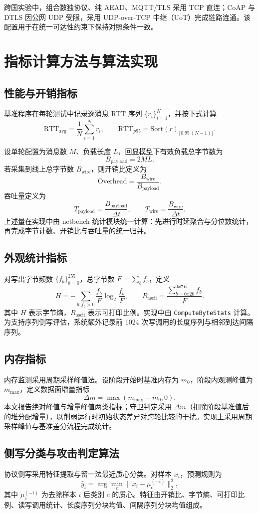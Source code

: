 跨国实验中，组合数独协议、纯 AEAD、MQTT/TLS 采用 TCP 直连；CoAP 与 DTLS 因公网 UDP 受限，采用 UDP-over-TCP 中继（UoT）完成链路连通。该配置用于在统一可达性约束下保持对照条件一致\cite{rfc8085,rfc4787,nedergaard2023coapsecure,ren2020coapcongestion}。

\section{指标计算方法与算法实现}
\subsection{性能与开销指标}
基准程序在每轮测试中记录逐消息 RTT 序列 $\{r_i\}_{i=1}^{N}$，并按下式计算
\[
\mathrm{RTT}_{\mathrm{avg}}=\frac{1}{N}\sum_{i=1}^{N}r_i,
\qquad
\mathrm{RTT}_{p95}=\mathrm{Sort}(r)_{\lfloor 0.95\,(N-1)\rfloor}.
\]

设单轮配置为消息数 $M$、负载长度 $L$，回显模型下有效负载总字节数为
\[
B_{\mathrm{payload}}=2ML.
\]
若采集到线上总字节数 $B_{\mathrm{wire}}$，则开销比定义为
\[
\mathrm{Overhead}=\frac{B_{\mathrm{wire}}}{B_{\mathrm{payload}}}.
\]
吞吐量定义为
\[
T_{\mathrm{payload}}=\frac{B_{\mathrm{payload}}}{\Delta t},
\qquad
T_{\mathrm{wire}}=\frac{B_{\mathrm{wire}}}{\Delta t}.
\]
上述量在实现中由 netbench 统计模块统一计算：先进行时延聚合与分位数统计，再完成字节计数、开销比与吞吐量的统一归并。

\subsection{外观统计指标}
对写出字节频数 $\{f_b\}_{b=0}^{255}$，总字节数 $F=\sum_b f_b$，定义
\[
H=-\sum_{b:f_b>0}\frac{f_b}{F}\log_2\frac{f_b}{F},
\qquad
R_{\mathrm{ascii}}=\frac{\sum_{b=0x20}^{0x7E}f_b}{F}.
\]
其中 $H$ 表示字节熵，$R_{\mathrm{ascii}}$ 表示可打印比例。实现中由 \texttt{ComputeByteStats} 计算。为支持序列侧写评估，系统额外记录前 1024 次写调用的长度序列与相邻到达间隔序列。

\subsection{内存指标}
内存监测采用周期采样峰值法。设阶段开始时基准内存为 $m_0$，阶段内观测峰值为 $m_{\max}$，定义数据面增量指标
\[
\Delta m=\max(m_{\max}-m_0,0).
\]
本文报告绝对峰值与增量峰值两类指标；守卫判定采用 $\Delta m$（扣除阶段基准值后的堆分配增量），以削弱运行时初始状态差异对跨轮比较的干扰。实现上采用周期采样峰值与基准差分流程完成统计。

\subsection{侧写分类与攻击判定算法}
协议侧写采用特征提取与留一法最近质心分类。对样本 $x_i$，预测规则为
\[
\hat{y}_i=\arg\min_{c}\|x_i-\mu_c^{(-i)}\|_2^2,
\]
其中 $\mu_c^{(-i)}$ 为去除样本 $i$ 后类别 $c$ 的质心。特征由开销比、字节熵、可打印比例、读写调用统计、长度序列分块均值、间隔序列分块均值组成。

